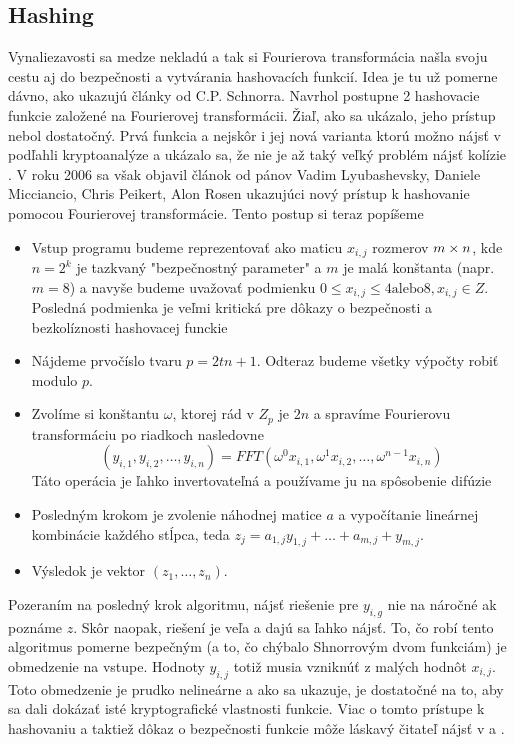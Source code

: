 \subsection{Hashing}

Vynaliezavosti sa medze nekladú a tak si Fourierova transformácia
našla svoju cestu aj do bezpečnosti a vytvárania hashovacích funkcií.
Idea je tu už pomerne dávno, ako ukazujú články od C.P. Schnorra.
Navrhol postupne 2 hashovacie funkcie založené na Fourierovej
transformácii. Žiaľ, ako sa ukázalo, jeho prístup nebol dostatočný.
Prvá funkcia a nejskôr i jej nová varianta ktorú možno nájsť v
\cite{schnorr} podľahli kryptoanalýze a
ukázalo sa, že nie je až taký veľký problém nájsť kolízie
\cite{ffthash_collisions}.
V roku 2006 sa však objavil článok od pánov 
Vadim Lyubashevsky,
Daniele Micciancio,
Chris Peikert,
Alon Rosen ukazujúci nový prístup k hashovanie pomocou Fourierovej
transformácie. Tento postup si teraz popíšeme

\begin{itemize}
    \item Vstup programu budeme reprezentovať ako maticu $x_{i,j}$
    rozmerov $m\times n$, kde $n=2^k$ je tazkvaný "bezpečnostný
    parameter" a $m$ je malá konštanta (napr. $m=8$) a navyše budeme
    uvažovať podmienku $0\le x_{i,j}\le 4 \text{alebo} 8, x_{i,j}\in Z$.
    Posledná podmienka je veľmi kritická pre dôkazy o bezpečnosti a
    bezkolíznosti hashovacej funckie
    \item Nájdeme prvočíslo tvaru $p=2tn+1$. Odteraz budeme všetky
    výpočty robiť modulo $p$.
    \item Zvolíme si konštantu $\omega$, ktorej rád v $Z_p$ je $2n$ 
    a spravíme Fourierovu
    transformáciu po riadkoch nasledovne
    \begin{equation}
     (y_{i,1}, y_{i,2}, \dots, y_{i,n}) = FFT(
     \omega^0 x_{i,1}, \omega^1 x_{i,2}, \dots, \omega^{n-1}
     x_{i,n})
     \end{equation}
     Táto operácia je ľahko invertovateľná a používame ju na
     spôsobenie difúzie
    \item
     Posledným krokom je zvolenie náhodnej matice $a$ a vypočítanie
     lineárnej kombinácie každého stĺpca, teda
      $z_j = a_{1,j} y_{1,j} + \dots + a_{m,j} + y_{m,j}$.
    \item
     Výsledok je vektor $(z_1, \dots, z_n)$.
\end{itemize}
Pozeraním na posledný krok algoritmu, nájsť riešenie pre 
 $y_{i,g}$ nie na náročné ak poznáme $z$. Skôr naopak, riešení je veľa a
 dajú sa ľahko nájsť.
 To, čo robí tento algoritmus pomerne bezpečným (a to, čo chýbalo
 Shnorrovým dvom funkciám) je obmedzenie na vstupe.
 Hodnoty $y_{i,j}$ totiž musia vzniknúť z malých hodnôt $x_{i,j}$.
 Toto obmedzenie je prudko nelineárne a 
 ako sa ukazuje, je dostatočné na to, aby sa dali
 dokázať isté kryptografické vlastnosti funkcie.
 Viac o tomto prístupe k hashovaniu a taktiež dôkaz o bezpečnosti
 funkcie môže láskavý čitateľ nájsť v \cite{fft-hash} a
 \cite{fft-swifft}.
